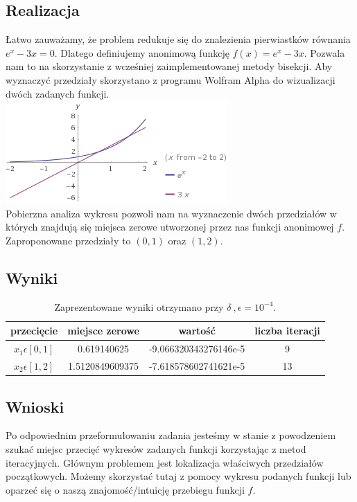 \documentclass[]{article}
\begin{document}
\subsection{Realizacja}
Łatwo zauważamy, że problem redukuje się do znalezienia pierwiastków równania $e^x - 3x = 0$. Dlatego definiujemy anonimową funkcję $f(x) = e^x - 3x$. Pozwala nam to na skorzystanie z wcześniej zaimplementowanej metody bisekcji. Aby wyznaczyć przedziały skorzystano z programu Wolfram Alpha do wizualizacji dwóch zadanych funkcji. 
\\
\includegraphics{plot}
\\ 
Pobierzna analiza wykresu pozwoli nam  na wyznaczenie dwóch przedziałów w których znajdują się miejsca zerowe utworzonej przez nas funkcji anonimowej $f$. Zaproponowane przedziały to $(0, 1)$ oraz $(1, 2)$.
\subsection{Wyniki}
\begin{table}[h]
	\centering
	\begin{tabular}{||c c c c||} 
		\hline
		przecięcie & miejsce zerowe & wartość & liczba iteracji \\ [0.5ex] 
		\hline\hline
		$x_1 \epsilon [0, 1]$ & 0.619140625 & -9.066320343276146e-5 & 9 \\
		
		$x_2 \epsilon [1, 2]$ & 1.5120849609375 & -7.618578602741621e-5 & 13 \\
		\hline
	\end{tabular}
	\caption{Zaprezentowane wyniki otrzymano przy $\delta\:,\epsilon = 10^{-4}$.}
\end{table}
\subsection{Wnioski}
Po odpowiednim przeformułowaniu zadania jesteśmy w stanie z powodzeniem szukać miejsc przecięć wykresów zadanych funkcji korzystając z metod iteracyjnych. Głównym problemem jest lokalizacja właściwych przedziałów początkowych. Możemy skorzystać tutaj z pomocy wykresu podanych funkcji lub oparzeć się o naszą znajomość/intuicję przebiegu funkcji $f$. 
\end{document}
